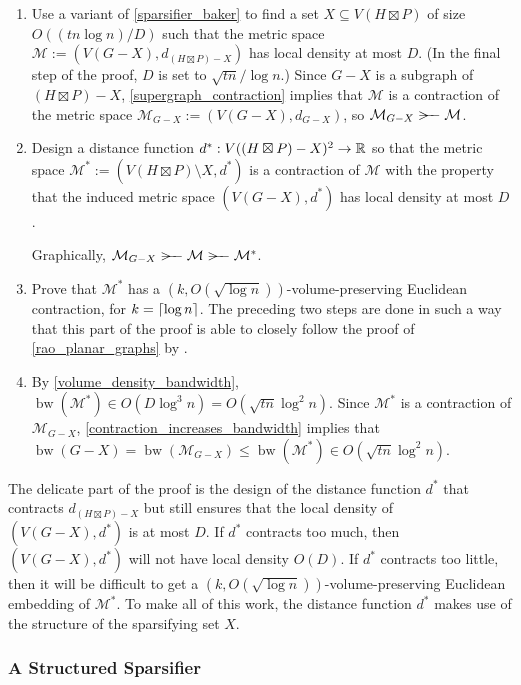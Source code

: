\documentclass{patmorin}
\renewcommand{\le}{\leqslant}
\DeclareMathOperator{\bw}{bw}
\begin{document}
\begin{enumerate}
  \item Use a variant of \cref{sparsifier_baker} to find a set $X\subseteq V(H\boxtimes P)$ of size $O((tn\log n)/D)$ such that the metric space $\mathcal{M}:=(V(G-X),d_{(H\boxtimes P)-X})$ has local density at most $D$. (In the final step of the proof, $D$ is set to $\sqrt{tn}/\log n$.)  Since $G-X$ is a subgraph of $(H\boxtimes P)-X$, \cref{supergraph_contraction} implies that $\mathcal{M}$ is a contraction of the metric space $\mathcal{M}_{G-X}:=(V(G-X),d_{G-X})$, so $\mathcal{M}_{G-X}\rightbroom\mathcal{M}$.

  \item Design a distance function $d^*:V((H\boxtimes P)-X)^2\to\mathbb{R}$ so that the metric space $\mathcal{M}^*:=(V(H\boxtimes P)\setminus X,d^*)$ is a contraction of $\mathcal{M}$ with the property that the induced metric space $(V(G-X),d^*)$ has local density at most $D$.

  Graphically, $\mathcal{M}_{G-X}\rightbroom\mathcal{M}\rightbroom\mathcal{M}^*$.

  \item Prove that $\mathcal{M}^*$ has a $(k,O(\sqrt{\log n}))$-volume-preserving Euclidean contraction, for $k={\lceil \log n \rceil}$.  The preceding two steps are done in such a way that this part of the proof is able to closely follow the proof of \cref{rao_planar_graphs} by \citet{rao:small}.

  \item  By \cref{volume_density_bandwidth},  $\bw(\mathcal{M}^*)\in O(D\log^3 n)=O(\sqrt{tn}\log^2 n)$.  Since $\mathcal{M}^*$ is a contraction of $\mathcal{M}_{G-X}$, \cref{contraction_increases_bandwidth} implies that $\bw(G-X)=\bw(\mathcal{M}_{G-X}) \le \bw(\mathcal{M}^*)\in O(\sqrt{tn}\log^2 n)$.
\end{enumerate}

The delicate part of the proof is the design of the distance function $d^*$ that contracts $d_{(H\boxtimes P)-X}$ but still ensures that the local density of $(V(G-X),d^*)$ is at most $D$. If $d^*$ contracts too much, then $(V(G-X),d^*)$ will not have local density $O(D)$. If $d^*$ contracts too little, then it will be difficult to get a $(k,O(\sqrt{\log n}))$-volume-preserving Euclidean embedding of $\mathcal{M}^*$.  To make all of this work, the distance function $d^*$ makes use of the structure of the sparsifying set $X$.  



\subsubsection{A Structured Sparsifier}
\label{x_definition}
\end{document}
